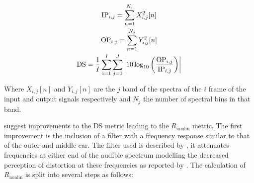 			\begin{gather}
				\mathrm{IP}_{i,j} = \sum_{n = 1}^{N_{j}} X_{i,j}^{2}[n] \nonumber \\
				\mathrm{OP}_{i,j} = \sum_{n = 1}^{N_{j}} Y_{i,j}^{2}[n] \nonumber \\
				\mathrm{DS} = \frac{1}{I} \sum_{i = 1}^{I} \sum_{j = 1}^{J} 
					\left|10\log_{10} \left( \frac{\mathrm{OP}_{i,j}}{\mathrm{IP}_{i,j}} \right) \right|
				\label{eq:DistortionScore}
			\end{gather}

			Where $X_{i,j}[n]$ and $Y_{i,j}[n]$ are the $j$ band of the spectra of the $i$
			frame of the input and output signals respectively and $N_{j}$ the number of spectral bins in that
			band.
			
			\citet{tan2004predicting} suggest improvements to the $\mathrm{DS}$ metric leading to the
			$R_{\mathrm{nonlin}}$ metric. The first improvement is the inclusion of a filter with a frequency
			response similar to that of the outer and middle ear. The filter used is described by
			\citet{glasberg2002a}, it attenuates frequencies at either end of the audible spectrum modelling the
			decreased perception of distortion at these frequencies as reported by
			\citet{voishvillo2006assessment}. The calculation of $R_{\mathrm{nonlin}}$ is split into several
			steps as follows:
			
